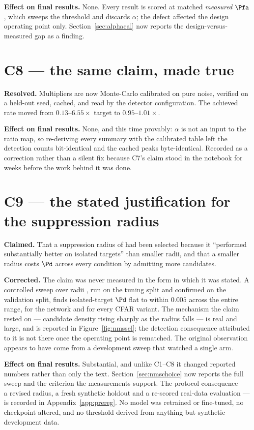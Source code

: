 \textbf{Effect on final results.} None. Every result is scored at matched \emph{measured} $\Pfa$,
which sweeps the threshold and discards $\alpha$; the defect affected the design operating point
only. Section~\ref{sec:alphacal} now reports the design-versus-measured gap as a finding.

\section{C8 --- the same claim, made true}

\textbf{Resolved.} Multipliers are now Monte-Carlo calibrated on pure noise, verified on a held-out
seed, cached, and read by the detector configuration. The achieved rate moved from
$0.13$--$6.55\times$ target to $0.95$--$1.01\times$.

\textbf{Effect on final results.} None, and this time provably: $\alpha$ is not an input to the
ratio map, so re-deriving every summary with the calibrated table left the detection counts
bit-identical and the cached peaks byte-identical. Recorded as a correction rather than a silent fix
because C7's claim stood in the notebook for weeks before the work behind it was done.

\section{C9 --- the stated justification for the suppression radius}

\textbf{Claimed.} That a suppression radius of \ProtocolNmsOriginal{} had been selected because it
``performed substantially better on isolated targets'' than smaller radii, and that a smaller radius
costs $\Pd$ across every condition by admitting more candidates.

\textbf{Corrected.} The claim was never measured in the form in which it was stated. A controlled
sweep over radii \NmsRadiiTested{}, run on the tuning split and confirmed on the validation split,
finds isolated-target $\Pd$ flat to within $0.005$ across the entire range, for the network and for
every CFAR variant. The mechanism the claim rested on --- candidate density rising sharply as the
radius falls --- is real and large, and is reported in Figure~\ref{fig:nmssel}; the detection
consequence attributed to it is not there once the operating point is rematched. The original
observation appears to have come from a development sweep that watched a single arm.

\textbf{Effect on final results.} Substantial, and unlike C1--C8 it changed reported numbers rather
than only the text. Section~\ref{sec:nmschoice} now reports the full sweep and the criterion the
measurements support. The protocol consequence --- a revised radius, a fresh synthetic holdout and a
re-scored real-data evaluation --- is recorded in Appendix~\ref{app:prereg}. No model was retrained
or fine-tuned, no checkpoint altered, and no threshold derived from anything but synthetic
development data.
